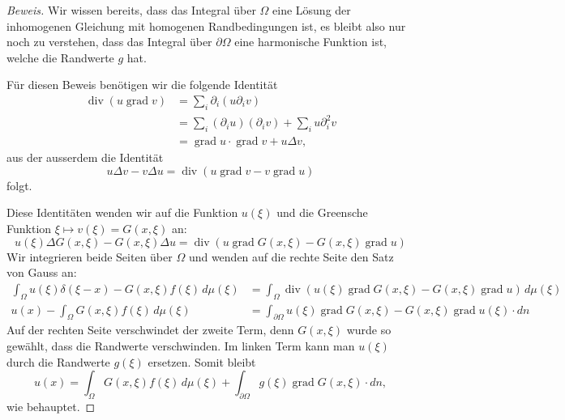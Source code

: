 \begin{proof}[Beweis]
Wir wissen bereits, dass das Integral über $\Omega$ eine Lösung der
inhomogenen Gleichung mit homogenen Randbedingungen ist, es
bleibt also nur noch zu verstehen, dass das Integral über $\partial \Omega$
eine harmonische Funktion ist, welche die Randwerte $g$ hat.

Für diesen Beweis benötigen wir die folgende Identität
\begin{align*}
\operatorname{div}(u\operatorname{grad}v)
&=
\sum_i\partial_i(u\partial_iv)
\\
&=\sum_i(\partial_iu)(\partial_iv)+\sum_iu\partial_i^2v
\\
&=\operatorname{grad}u\cdot\operatorname{grad}v+u\Delta v,
\end{align*}
aus der ausserdem die Identität
\[
u\Delta v-v\Delta u=\operatorname{div}(u\operatorname{grad}v-v\operatorname{grad}u)
\]
folgt.

Diese Identitäten wenden wir auf die Funktion $u(\xi)$
und die Greensche Funktion $\xi\mapsto v(\xi)=G(x,\xi)$ an:
\[
u(\xi)\Delta G(x,\xi)-G(x,\xi)\Delta u
=
\operatorname{div}(u\operatorname{grad}G(x,\xi)-G(x,\xi)\operatorname{grad}u)
\]
Wir integrieren beide Seiten über $\Omega$ und wenden auf die rechte Seite
den Satz von Gauss an:
\begin{align*}
\int_{\Omega}u(\xi)\delta(\xi - x)-G(x,\xi)f(\xi)\,d\mu(\xi)
&=
\int_{\Omega}\operatorname{div}(u(\xi)\operatorname{grad}G(x,\xi)-G(x,\xi)\operatorname{grad}u)\,d\mu(\xi)
\\
u(x)-\int_{\Omega}G(x,\xi)f(\xi)\,d\mu(\xi)
&=\int_{\partial \Omega}u(\xi)\operatorname{grad}G(x,\xi)-G(x,\xi)\operatorname{grad}u(\xi)\cdot dn
\end{align*}
Auf der rechten Seite verschwindet der zweite Term, denn $G(x,\xi)$ wurde
so gewählt, dass die Randwerte verschwinden.
Im linken Term kann man $u(\xi)$ durch die Randwerte $g(\xi)$ ersetzen.
Somit bleibt
\[
u(x)=\int_{\Omega}G(x,\xi)f(\xi)\,d\mu(\xi)+\int_{\partial\Omega}g(\xi)\operatorname{grad}G(x,\xi)\cdot dn,
\]
wie behauptet.
\end{proof}

